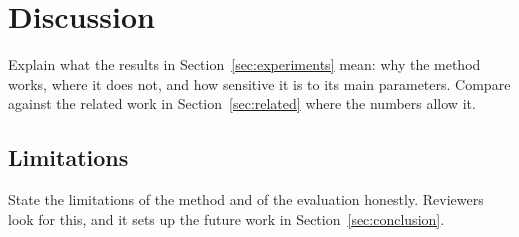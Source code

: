 \section{Discussion}
\label{sec:discussion}

Explain what the results in Section~\ref{sec:experiments} mean: why the method works, where it does not, and how sensitive it is to its main parameters. Compare against the related work in Section~\ref{sec:related} where the numbers allow it.

\subsection{Limitations}
State the limitations of the method and of the evaluation honestly. Reviewers look for this, and it sets up the future work in Section~\ref{sec:conclusion}.
